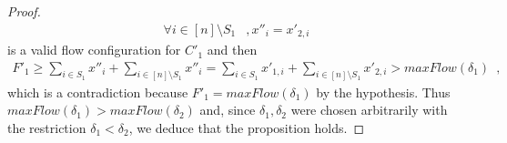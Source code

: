 \begin{proof}
\begin{align*}
    \forall i \in [n] \setminus S_1&, x''_i = x'_{2, i}
  \end{align*}
  is a valid flow configuration for $C'_1$ and then
  \begin{equation*}
  \begin{gathered}
    F'_1 \geq \sum\limits_{i \in S_1}x''_i + \sum\limits_{i \in [n] \setminus S_1}x''_i = \sum\limits_{i \in S_1}x'_{1, i} +
    \sum\limits_{i \in [n] \setminus S_1}x'_{2, i} > maxFlow\left(\delta_1\right)
    \enspace,
  \end{gathered}
  \end{equation*}
  which is a contradiction because $F'_1 = maxFlow\left(\delta_1\right)$ by the hypothesis. Thus
  $maxFlow\left(\delta_1\right) > maxFlow\left(\delta_2\right)$ and, since $\delta_1, \delta_2$ were chosen arbitrarily with
  the restriction $\delta_1 < \delta_2$, we deduce that the proposition holds.
\end{proof}
